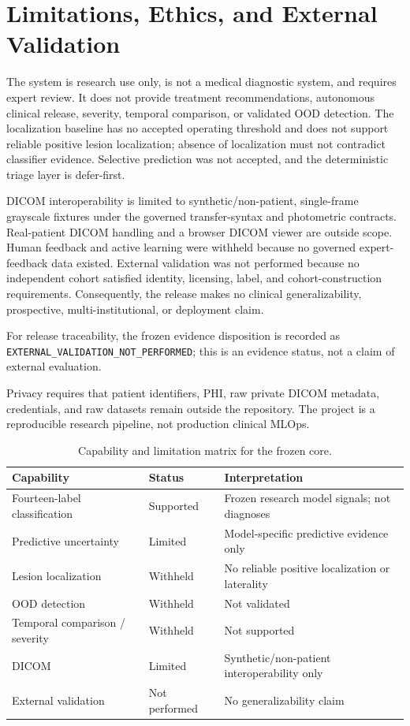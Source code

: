 \documentclass[10pt,a4paper,twocolumn]{article}
\begin{document}
\section{Limitations, Ethics, and External Validation}
The system is research use only, is not a medical diagnostic system, and requires expert review. It does not provide treatment recommendations, autonomous clinical release, severity, temporal comparison, or validated OOD detection. The localization baseline has no accepted operating threshold and does not support reliable positive lesion localization; absence of localization must not contradict classifier evidence. Selective prediction was not accepted, and the deterministic triage layer is defer-first.

DICOM interoperability is limited to synthetic/non-patient, single-frame grayscale fixtures under the governed transfer-syntax and photometric contracts. Real-patient DICOM handling and a browser DICOM viewer are outside scope. Human feedback and active learning were withheld because no governed expert-feedback data existed. External validation was not performed because no independent cohort satisfied identity, licensing, label, and cohort-construction requirements. Consequently, the release makes no clinical generalizability, prospective, multi-institutional, or deployment claim.

For release traceability, the frozen evidence disposition is recorded as \texttt{EXTERNAL\_VALIDATION\_NOT\_PERFORMED}; this is an evidence status, not a claim of external evaluation.

Privacy requires that patient identifiers, PHI, raw private DICOM metadata, credentials, and raw datasets remain outside the repository. The project is a reproducible research pipeline, not production clinical MLOps.

\begin{table}[t]
\centering\footnotesize
\renewcommand{\arraystretch}{1.12}
\caption{Capability and limitation matrix for the frozen core.}
\label{tab:scope}
\begin{tabularx}{\columnwidth}{@{}>{\raggedright\arraybackslash}p{} >{\raggedright\arraybackslash}p{} Y@{}}
\toprule
\textbf{Capability} & \textbf{Status} & \textbf{Interpretation}\\
\midrule
Fourteen-label classification & Supported & Frozen research model signals; not diagnoses\\
Predictive uncertainty & Limited & Model-specific predictive evidence only\\
Lesion localization & Withheld & No reliable positive localization or laterality\\
OOD detection & Withheld & Not validated\\
Temporal comparison / severity & Withheld & Not supported\\
DICOM & Limited & Synthetic/non-patient interoperability only\\
External validation & Not performed & No generalizability claim\\
\bottomrule
\end{tabularx}
\end{table}
\end{document}

